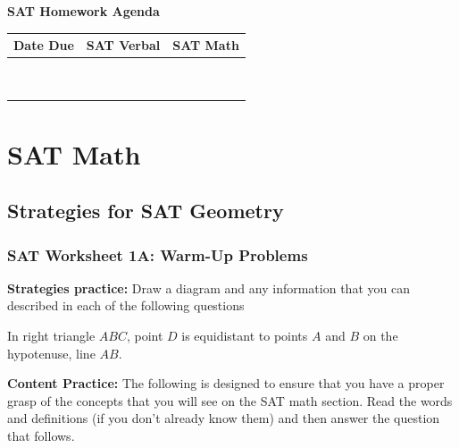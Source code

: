 \documentclass[12pt]{book}
\begin{document}
\newpage
\centerline{\textbf{SAT Homework Agenda}}

\bigskip
\begin{spacing}{1.5}
\begin{tabularx}{\textwidth}{|*3{@{}>{\bfseries\centering\arraybackslash}X|}}\hline
Date Due & SAT Verbal & SAT Math\\\hline
& & \\[8ex]\hline
& & \\[8ex]\hline
& & \\[8ex]\hline
& & \\[8ex]\hline
& & \\[8ex]\hline
& & \\[8ex]\hline
& & \\[8ex]\hline
& & \\[8ex]\hline
& & \\[8ex]\hline
\end{tabularx}
\end{spacing}

\part{SAT Math}
\chapter[SAT Geometry]{Strategies for SAT Geometry}

\section{SAT Worksheet 1A: Warm-Up Problems}

\textbf{Strategies practice:} Draw a diagram and any information that you can described in each of the following questions

\begin{multienumerate}
{In right triangle $ABC$, point $D$ is equidistant to points $A$ and $B$ on the hypotenuse, line $AB$.}
\end{multienumerate}

\vfill
\hrulefill

\textbf{Content Practice:} The following is designed to ensure that you have a proper grasp of the concepts that you will see on the SAT math section. Read the words and definitions (if you don't already know them) and then answer the question that follows.
\end{document}
